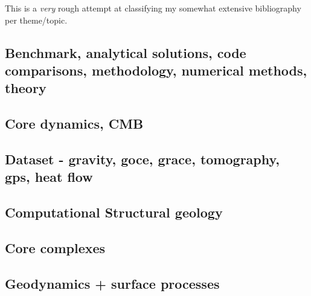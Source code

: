 This is a {\it very} rough attempt at classifying my somewhat extensive 
bibliography per theme/topic.
 


\subsection*{Benchmark, analytical solutions, code comparisons, methodology, numerical methods, theory}

\cite{yusa84}
\cite{trab90}
\cite{zhon96}
\cite{rist97}
\cite{lind99}
\cite{taki03}
\cite{toma07}
\cite{zhmt08}\cite{deka08}\cite{trub08}
\cite{dumg11}\cite{uibb11}
\cite{thmk14}
\cite{lelk15}\cite{rumi15}
\cite{dumy16}
\cite{robh17}\cite{wisv17}
\cite{clhe19}

\subsection*{Core dynamics, CMB}

\cite{hayu96}
\cite{lahb08}

\subsection*{Dataset - gravity, goce, grace, tomography, gps, heat flow}

\cite{dzan81}
\cite{krhh03}
\cite{hawj12}\cite{resa12}\cite{hawj12}
\cite{ress13}\cite{ebbf13}\cite{davi13}
\cite{paml14}\cite{ebbf14}\cite{krbk14}
\cite{boem15}

\subsection*{Computational Structural geology}

\cite{acgf00}
\cite{trla00}

\subsection*{Core complexes}

\cite{lehm12}

\subsection*{Geodynamics + surface processes}

